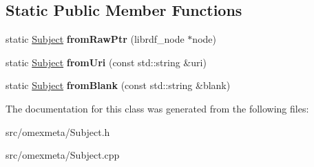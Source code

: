 \subsection*{Static Public Member Functions}
\begin{DoxyCompactItemize}
\item 
\mbox{\label{classomexmeta_1_1Subject_a845dda888ce07265306d0eb6b46cd989}} 
static \hyperlink{classomexmeta_1_1Subject}{Subject} {\bfseries from\+Raw\+Ptr} (librdf\+\_\+node $\ast$node)
\item 
\mbox{\label{classomexmeta_1_1Subject_a346583235b81d5bd523818de09d7359e}} 
static \hyperlink{classomexmeta_1_1Subject}{Subject} {\bfseries from\+Uri} (const std\+::string \&uri)
\item 
\mbox{\label{classomexmeta_1_1Subject_a315d058097112f4081c4db7860346aef}} 
static \hyperlink{classomexmeta_1_1Subject}{Subject} {\bfseries from\+Blank} (const std\+::string \&blank)
\end{DoxyCompactItemize}


The documentation for this class was generated from the following files\+:\begin{DoxyCompactItemize}
\item 
src/omexmeta/Subject.\+h\item 
src/omexmeta/Subject.\+cpp\end{DoxyCompactItemize}
